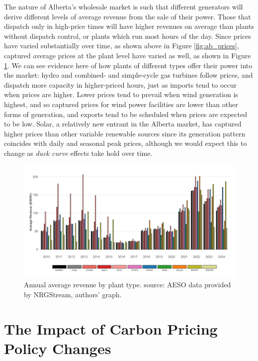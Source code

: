 \documentclass[12pt]{article}
\begin{document}
The nature of Alberta's wholesale market is such that different generators will derive different levels of average revenue from the sale of their power. Those that dispatch only in high-price times will have higher revenues on average than plants without dispatch control, or plants which run most hours of the day. Since prices have varied substantially over time, as shown above in Figure \ref{fig:ab_prices}, captured average prices at the plant level have varied as well, as shown in Figure \ref{fig:capture_prices}. We can see evidence here of how plants of different types offer their power into the market: hydro and combined- and simple-cycle gas turbines follow prices, and dispatch more capacity in higher-priced hours, just as imports tend to occur when prices are higher. Lower prices tend to prevail when wind generation is highest, and so captured prices for wind power facilities are lower than other forms of generation, and exports tend to be scheduled when prices are expected to be low. Solar, a relatively new entrant in the Alberta market, has captured higher prices than other variable renewable sources since its generation pattern coincides with daily and seasonal peak prices, although we would expect this to change as \emph{duck curve} effects take hold over time.

\begin{figure}[t]%
	\centering \vspace{-.25cm} \includegraphics[width=6.5in]{../images/price_capture.png}
\vspace{-0.75cm}	\caption{Annual average revenue by plant type. source: AESO data provided by NRGStream, authors' graph.}
\label{fig:capture_prices}
\end{figure}


\section{The Impact of Carbon Pricing Policy Changes}
\end{document}

